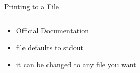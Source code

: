 % 
% 
% 
\begin{Slide}{Printing to a File}
  \begin{columns}
    \begin{column}{.48\textwidth}
      \begin{itemize}
      \item \underline{\href{https://docs.python.org/release/3.1/library/functions.html\#print}{Official Documentation}}
      \item file defaults to stdout
      \item it can be changed to any file you want
      \end{itemize}
    \end{column}

    \hfill

    \begin{column}{.48\textwidth}

      \pause

      \inputminted[firstline=3,
      lastline=27,
      breaklines,
      fontsize=\tiny,
      bgcolor=Background,
      linenos]{python}{../src/filep.py}

      
    \end{column}
  \end{columns} 
\end{Slide}
